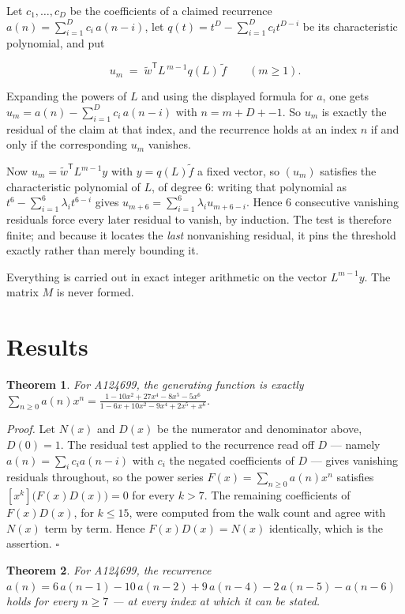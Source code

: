\documentclass[11pt]{article}
\newtheorem{theorem}{Theorem}
\theoremstyle{definition}
\begin{document}
Let $c_1,\dots,c_D$ be the coefficients of a claimed recurrence $a(n) = \sum_{i=1}^{D} c_i\,a(n-i)$, let $q(t) = t^{D} - \sum_{i=1}^{D} c_i t^{D-i}$ be its characteristic polynomial, and put

\[u_m \;=\; \tilde w^{\mathsf T} L^{\,m-1} q(L)\,\tilde f \qquad (m \ge 1).\]

Expanding the powers of $L$ and using the displayed formula for $a$, one gets $u_m = a(n) - \sum_{i=1}^{D} c_i\,a(n-i)$ with $n = m + D + -1$. So $u_m$ is exactly the residual of the claim at that index, and the recurrence holds at an index $n$ if and only if the corresponding $u_m$ vanishes.

Now $u_m = \tilde w^{\mathsf T} L^{m-1} y$ with $y = q(L)\tilde f$ a fixed vector, so $(u_m)$ satisfies the characteristic polynomial of $L$, of degree $6$: writing that polynomial as $t^{6} - \sum_{i=1}^{6} \lambda_i t^{6-i}$ gives $u_{m+6} = \sum_{i=1}^{6} \lambda_i u_{m+6-i}$. Hence $6$ consecutive vanishing residuals force every later residual to vanish, by induction. The test is therefore finite; and because it locates the {\itshape last} nonvanishing residual, it pins the threshold exactly rather than merely bounding it.

Everything is carried out in exact integer arithmetic on the vector $L^{m-1}y$. The matrix $M$ is never formed.

\section{Results}

\begin{theorem} For A124699, the generating function is exactly $\sum_{n\ge 0} a(n)x^n = \frac{1 - 10x^{2} + 27x^{4} - 8x^{5} - 5x^{6}}{1 - 6x + 10x^{2} - 9x^{4} + 2x^{5} + x^{6}}$.\end{theorem}

{\itshape Proof.} Let $N(x)$ and $D(x)$ be the numerator and denominator above, $D(0)=1$. The residual test applied to the recurrence read off $D$ --- namely $a(n) = \sum_i c_i a(n-i)$ with $c_i$ the negated coefficients of $D$ --- gives vanishing residuals throughout, so the power series $F(x)=\sum_{n\ge 0}a(n)x^n$ satisfies $[x^k]\bigl(F(x)D(x)\bigr) = 0$ for every $k > 7$. The remaining coefficients of $F(x)D(x)$, for $k \le 15$, were computed from the walk count and agree with $N(x)$ term by term. Hence $F(x)D(x) = N(x)$ identically, which is the assertion. $\square$

\begin{theorem} For A124699, the recurrence $a(n) = 6\,a(n-1) - 10\,a(n-2) + 9\,a(n-4) - 2\,a(n-5) - a(n-6)$ holds for every $n \ge 7$ --- at every index at which it can be stated.\end{theorem}
\end{document}
